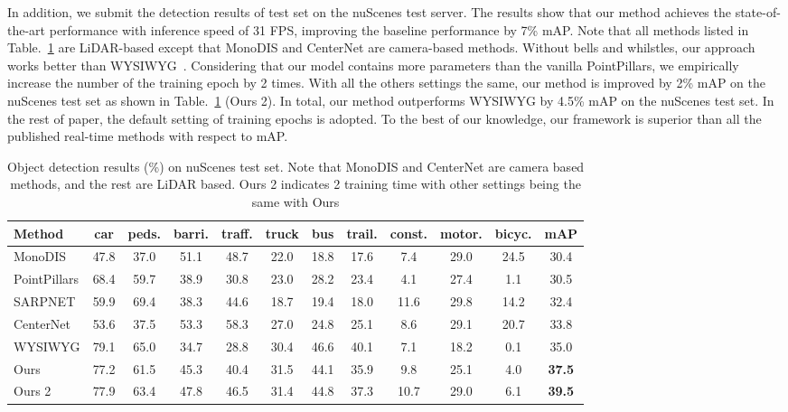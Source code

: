 \documentclass[runningheads]{llncs}
\begin{document}
 In addition, we submit the detection results of test set on the nuScenes test server. The results show that our method achieves the state-of-the-art performance with inference speed of 31 FPS, improving the baseline performance by 7\% mAP. Note that all methods listed in Table.~\ref{table:2} are LiDAR-based except that MonoDIS \cite{simonelli2019disentangling} and CenterNet\cite{zhou2019objects} are camera-based methods. Without bells and whilstles, our approach works better than WYSIWYG~\cite{hu2019you}. 
 Considering that our model contains more parameters than the vanilla PointPillars, we empirically increase the number of the training epoch by 2 times. With all the others settings the same, our method is improved by 2\% mAP on the nuScenes test set as shown in Table.~\ref{table:2} (Ours 2). In total, our method outperforms WYSIWYG\cite{hu2019you} by 4.5\% mAP on the nuScenes test set. In the rest of paper, the default setting of training epochs is adopted.
 To the best of our knowledge, our framework is superior than all the published real-time methods with respect to mAP.
 
 
\begin{table}[h!]
\centering
\caption{Object detection results (\%) on nuScenes test set. Note that MonoDIS and CenterNet are camera based methods, and the rest are LiDAR based. Ours 2 indicates 2 training time with other settings being the same with Ours}
\begin{tabular}{l c c c c c c c c c c c} 
 \hline
 Method & car & peds. & barri. & traff. & truck & bus & trail. & const. & motor. & bicyc. & mAP \\ [0.5ex] 
 \hline
  MonoDIS \cite{simonelli2019disentangling} & 47.8 & 37.0 & 51.1 & 48.7 & 22.0 & 18.8 & 17.6 & 7.4 & 29.0 & 24.5 & 30.4 \\
  PointPillars \cite{lang2019PointPillars}  & 68.4 & 59.7 & 38.9 & 30.8 & 23.0 & 28.2 & 23.4 & 4.1 & 27.4 & 1.1 & 30.5\\
  SARPNET \cite{ye2020sarpnet} & 59.9 & 69.4 & 38.3 & 44.6 & 18.7 & 19.4 & 18.0 & 11.6 & 29.8 & 14.2 & 32.4 \\
  CenterNet \cite{zhou2019objects} & 53.6 & 37.5 & 53.3 & 58.3 & 27.0 & 24.8 & 25.1 & 8.6 & 29.1 & 20.7 & 33.8 \\ 
  WYSIWYG \cite{hu2019you}  & 79.1 & 65.0 & 34.7 & 28.8 & 30.4 & 46.6 & 40.1 & 7.1 & 18.2 & 0.1 & 35.0 \\

  \hline
   Ours & 77.2 & 61.5 & 45.3 & 40.4 & 31.5 & 44.1 & 35.9 & 9.8 & 25.1 & 4.0 & \bf 37.5 \\ 
   Ours 2 & 77.9 & 63.4 & 47.8 & 46.5 & 31.4 & 44.8 & 37.3 & 10.7 & 29.0 & 6.1 & \bf 39.5 \\ 

 \hline
\end{tabular}
\label{table:2}
\end{table}
\end{document}
